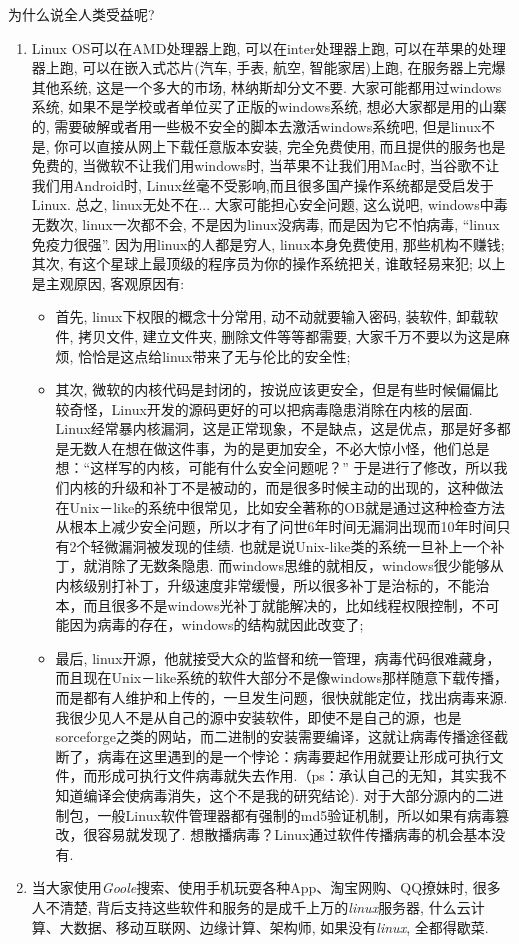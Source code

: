 \documentclass[utf8]{book}
\begin{document}
	为什么说全人类受益呢?  
	\begin{enumerate}
		\item {\normalsize Linux OS可以在AMD处理器上跑, 可以在inter处理器上跑, 可以在苹果的处理器上跑, 可以在嵌入式芯片(汽车, 手表, 航空, 智能家居)上跑, 在服务器上完爆其他系统, 这是一个多大的市场, 林纳斯却分文不要. 大家可能都用过windows系统, 如果不是学校或者单位买了正版的windows系统, 想必大家都是用的山寨的, 需要破解或者用一些极不安全的脚本去激活windows系统吧, 但是linux不是, 你可以直接从网上下载任意版本安装, 完全免费使用, 而且提供的服务也是免费的, 当微软不让我们用windows时, 当苹果不让我们用Mac时, 当谷歌不让我们用Android时, Linux丝毫不受影响,而且很多国产操作系统都是受启发于Linux. 总之, linux无处不在... 大家可能担心安全问题, 这么说吧, windows中毒无数次, linux一次都不会, 不是因为linux没病毒, 而是因为它不怕病毒, “linux免疫力很强”. 因为用linux的人都是穷人, linux本身免费使用, 那些机构不赚钱; 其次, 有这个星球上最顶级的程序员为你的操作系统把关, 谁敢轻易来犯; 以上是主观原因, 客观原因有: }
		\begin{itemize}
			\item {\small 首先, linux下权限的概念十分常用, 动不动就要输入密码, 装软件, 卸载软件, 拷贝文件, 建立文件夹, 删除文件等等都需要, 大家千万不要以为这是麻烦, 恰恰是这点给linux带来了无与伦比的安全性; }
			\item {\small 其次, 微软的内核代码是封闭的，按说应该更安全，但是有些时候偏偏比较奇怪，Linux开发的源码更好的可以把病毒隐患消除在内核的层面. Linux经常暴内核漏洞，这是正常现象，不是缺点，这是优点，那是好多都是无数人在想在做这件事，为的是更加安全，不必大惊小怪，他们总是想：“这样写的内核，可能有什么安全问题呢？” 于是进行了修改，所以我们内核的升级和补丁不是被动的，而是很多时候主动的出现的，这种做法在Unix－like的系统中很常见，比如安全著称的OB就是通过这种检查方法从根本上减少安全问题，所以才有了问世6年时间无漏洞出现而10年时间只有2个轻微漏洞被发现的佳绩. 也就是说Unix-like类的系统一旦补上一个补丁，就消除了无数条隐患. 而windows思维的就相反，windows很少能够从内核级别打补丁，升级速度非常缓慢，所以很多补丁是治标的，不能治本，而且很多不是windows光补丁就能解决的，比如线程权限控制，不可能因为病毒的存在，windows的结构就因此改变了; }
			\item {\small 最后, linux开源，他就接受大众的监督和统一管理，病毒代码很难藏身，而且现在Unix－like系统的软件大部分不是像windows那样随意下载传播，而是都有人维护和上传的，一旦发生问题，很快就能定位，找出病毒来源. 我很少见人不是从自己的源中安装软件，即使不是自己的源，也是sorceforge之类的网站，而二进制的安装需要编译，这就让病毒传播途径截断了，病毒在这里遇到的是一个悖论：病毒要起作用就要让形成可执行文件，而形成可执行文件病毒就失去作用.（ps：承认自己的无知，其实我不知道编译会使病毒消失，这个不是我的研究结论). 对于大部分源内的二进制包，一般Linux软件管理器都有强制的md5验证机制，所以如果有病毒篡改，很容易就发现了. 想散播病毒？Linux通过软件传播病毒的机会基本没有.}
		\end{itemize}
		
		\item{\normalsize 当大家使用\textit{Goole}搜索、使用手机玩耍各种App、淘宝网购、QQ撩妹时, 很多人不清楚, 背后支持这些软件和服务的是成千上万的\textit{linux}服务器, 什么云计算、大数据、移动互联网、边缘计算、架构师, 如果没有\textit{linux}, 全都得歇菜.} 
	\end{enumerate}
\end{document}
